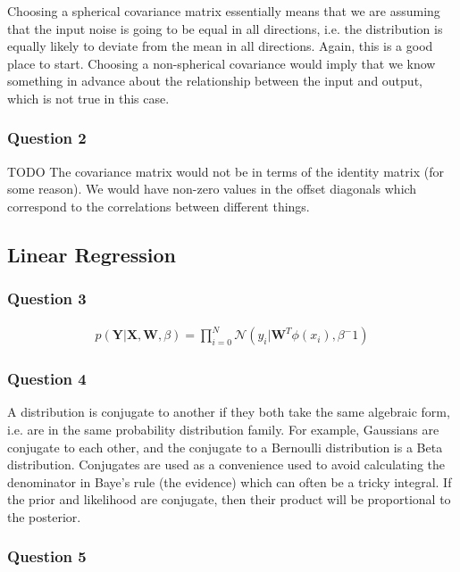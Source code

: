 \documentclass[10pt, a4paper, twocolumn]{article} %
\begin{document}
Choosing a spherical covariance matrix essentially means that we are assuming that the input noise is going to be equal in all directions, i.e. the distribution is equally likely to deviate from the mean in all directions. Again, this is a good place to start. Choosing a non-spherical covariance would imply that we know something in advance about the relationship between the input and output, which is not true in this case.

\subsubsection*{Question 2}

TODO
The covariance matrix would not be in terms of the identity matrix (for some reason). We would have non-zero values in the offset diagonals which correspond to the correlations between different things.

\subsection{Linear Regression}

\subsubsection*{Question 3}

\begin{align}
  p(\mathbf{Y} | \mathbf{X}, \mathbf{W}, \beta) = \prod_{i=0}^N \mathcal{N} (y_i | \mathbf{W}^T\phi(x_i), \beta^-1)
\end{align}

\subsubsection*{Question 4}

A distribution is conjugate to another if they both take the same algebraic form, i.e. are in the same probability distribution family. For example, Gaussians are conjugate to each other, and the conjugate to a Bernoulli distribution is a Beta distribution. Conjugates are used as a convenience used to avoid calculating the denominator in Baye's rule (the evidence) which can often be a tricky integral. If the prior and likelihood are conjugate, then their product will be proportional to the posterior.

\subsubsection*{Question 5}
\end{document}
